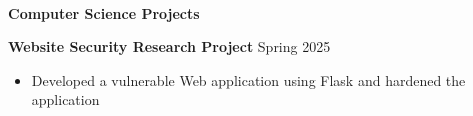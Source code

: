 \begin{flushleft}
    \hrulefill \\
    \begin{large}
        \begin{center}\textbf{Computer Science Projects} \end{center}
    \end{large} 
\end{flushleft}
\textbf{Website Security Research Project} \hfill Spring 2025
\begin{itemize}
    \item Developed a vulnerable Web application using Flask and hardened the application
\end{itemize}